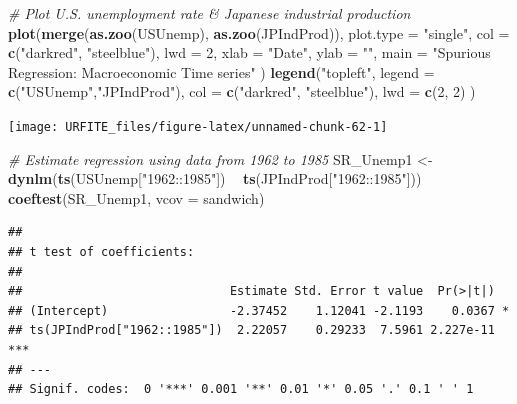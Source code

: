 \documentclass[]{book}
\newenvironment{Shaded}{\begin{snugshade}}{\end{snugshade}}
\newcommand{\KeywordTok}[1]{\textcolor[rgb]{0.13,0.29,0.53}{\textbf{#1}}}
\newcommand{\DataTypeTok}[1]{\textcolor[rgb]{0.13,0.29,0.53}{#1}}
\newcommand{\DecValTok}[1]{\textcolor[rgb]{0.00,0.00,0.81}{#1}}
\newcommand{\StringTok}[1]{\textcolor[rgb]{0.31,0.60,0.02}{#1}}
\newcommand{\CommentTok}[1]{\textcolor[rgb]{0.56,0.35,0.01}{\textit{#1}}}
\newcommand{\OperatorTok}[1]{\textcolor[rgb]{0.81,0.36,0.00}{\textbf{#1}}}
\newcommand{\NormalTok}[1]{#1}
\theoremstyle{definition}
\theoremstyle{definition}
\theoremstyle{definition}
\theoremstyle{remark}
\begin{document}
\begin{Shaded}
\begin{Highlighting}[]
\CommentTok{# Plot U.S. unemployment rate & Japanese industrial production}
\KeywordTok{plot}\NormalTok{(}\KeywordTok{merge}\NormalTok{(}\KeywordTok{as.zoo}\NormalTok{(USUnemp), }\KeywordTok{as.zoo}\NormalTok{(JPIndProd)), }
     \DataTypeTok{plot.type =} \StringTok{"single"}\NormalTok{, }
     \DataTypeTok{col =} \KeywordTok{c}\NormalTok{(}\StringTok{"darkred"}\NormalTok{, }\StringTok{"steelblue"}\NormalTok{),}
     \DataTypeTok{lwd =} \DecValTok{2}\NormalTok{,}
     \DataTypeTok{xlab =} \StringTok{"Date"}\NormalTok{,}
     \DataTypeTok{ylab =} \StringTok{""}\NormalTok{,}
     \DataTypeTok{main =} \StringTok{"Spurious Regression: Macroeconomic Time series"}
\NormalTok{)}
\KeywordTok{legend}\NormalTok{(}\StringTok{"topleft"}\NormalTok{, }
       \DataTypeTok{legend =} \KeywordTok{c}\NormalTok{(}\StringTok{"USUnemp"}\NormalTok{,}\StringTok{"JPIndProd"}\NormalTok{),}
       \DataTypeTok{col =} \KeywordTok{c}\NormalTok{(}\StringTok{"darkred"}\NormalTok{, }\StringTok{"steelblue"}\NormalTok{),}
       \DataTypeTok{lwd =} \KeywordTok{c}\NormalTok{(}\DecValTok{2}\NormalTok{, }\DecValTok{2}\NormalTok{)}
\NormalTok{       )}
\end{Highlighting}
\end{Shaded}

\begin{center}\texttt{[image: URFITE\_files/figure-latex/unnamed-chunk-62-1]} \end{center}

\begin{Shaded}
\begin{Highlighting}[]
\CommentTok{# Estimate regression using data from 1962 to 1985}
\NormalTok{SR_Unemp1 <-}\StringTok{ }\KeywordTok{dynlm}\NormalTok{(}\KeywordTok{ts}\NormalTok{(USUnemp[}\StringTok{"1962::1985"}\NormalTok{]) }\OperatorTok{~}\StringTok{ }\KeywordTok{ts}\NormalTok{(JPIndProd[}\StringTok{"1962::1985"}\NormalTok{]))}
\KeywordTok{coeftest}\NormalTok{(SR_Unemp1, }\DataTypeTok{vcov =}\NormalTok{ sandwich)}
\end{Highlighting}
\end{Shaded}

\begin{verbatim}
## 
## t test of coefficients:
## 
##                             Estimate Std. Error t value  Pr(>|t|)    
## (Intercept)                 -2.37452    1.12041 -2.1193    0.0367 *  
## ts(JPIndProd["1962::1985"])  2.22057    0.29233  7.5961 2.227e-11 ***
## ---
## Signif. codes:  0 '***' 0.001 '**' 0.01 '*' 0.05 '.' 0.1 ' ' 1
\end{verbatim}
\end{document}
